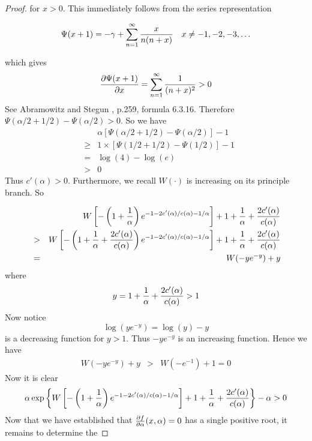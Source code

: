 \begin{subappendices}
\begin{proof}
\begin{minipage}{0.55\textwidth}
    for $x > 0$. This immediately follows from the series
    representation
    \begin{small}
    \[
    \Psi(x + 1) = -\gamma + \sum_{n=1}^\infty {x \over n(n + x)}
    \quad x \neq -1, -2, -3,\ldots
    \]
    \end{small}
    which gives
    \[
    {\partial \Psi(x + 1) \over \partial x}
    = \sum_{n=1}^\infty {1 \over (n + x)^2} > 0
    \]
    See Abramowitz and Stegun \cite{abramowitz1972handbook}, p.259,
    formula 6.3.16. Therefore $\Psi(\alpha/2 + 1/2) - \Psi(\alpha/2) > 0$.
    So we have
    \begin{eqnarray*}
      && \alpha \left[
        \Psi(\alpha/2 + 1/2) - \Psi(\alpha/2)
      \right] - 1 \\
      &\geq& 1 \times \left[
        \Psi(1/2 + 1/2) - \Psi(1/2)
      \right] - 1 \\
      &=& \log(4) - \log(e) \\
      &>& 0
    \end{eqnarray*}
    Thus $c'(\alpha) > 0$. Furthermore, we recall
    $W(\cdot)$ is increasing on its principle branch. So
  \end{minipage}
  \begin{eqnarray*}
    &&
    W\left[
      -\left( 1 + {1 \over \alpha} \right)
      e^{-1 - 2 c'(\alpha)/c(\alpha) - 1/\alpha}
    \right]
    + 1 + {1 \over \alpha} + {2 c'(\alpha) \over c(\alpha)} \\
    &>& 
    W\left[
      -\left( 1 + {1 \over \alpha} + {2 c'(\alpha) \over c(\alpha)} \right)
      e^{-1 - 2 c'(\alpha)/c(\alpha) - 1/\alpha}
    \right]
    + 1 + {1 \over \alpha} + {2 c'(\alpha) \over c(\alpha)} \\
    &=& W(-y e^{-y}) + y
  \end{eqnarray*}
  where
  \[
  y = 1 + {1 \over \alpha} + {2 c'(\alpha) \over c(\alpha)} > 1
  \]
  Now notice
  \[
  \log(y e^{-y}) = \log(y) - y
  \]
  is a decreasing function for $y > 1$. Thus $-y e^{-y}$ is an
  increasing function. Hence we have
  \begin{eqnarray*}
    W(-y e^{-y}) + y &>& W(-e^{-1}) + 1 = 0
  \end{eqnarray*}
  Now it is clear
  \[
  \alpha\exp\left\{
    W\left[
      -\left(1 + {1 \over \alpha}\right)
      e^{-1 - 2 c'(\alpha)/c(\alpha) - 1/\alpha}
    \right]
    + 1 + {1 \over \alpha} + {2 c'(\alpha) \over c(\alpha)}
  \right\} - \alpha > 0
  \]
  Now that we have established that ${\partial f \over \partial \alpha}(x,
  \alpha) = 0$ has a single positive root, it remains to determine the

\end{proof}
\end{subappendices}
